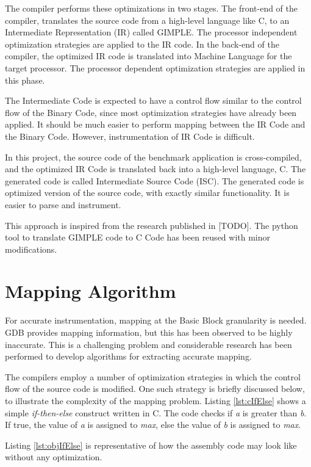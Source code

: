 The compiler performs these optimizations in two stages. The front-end of the compiler, translates the source code from a high-level language like C, to an Intermediate Representation (IR) called GIMPLE. The processor independent optimization strategies are applied to the IR code. In the back-end of the compiler, the optimized IR code is translated into Machine Language for the target processor. The processor dependent optimization strategies are applied in this phase.

The Intermediate Code is expected to have a control flow similar to the control flow of the Binary Code, since most optimization strategies have already been applied. It should be much easier to perform mapping between the IR Code and the Binary Code. However, instrumentation of IR Code is difficult. 

In this project, the source code of the benchmark application is cross-compiled, and the optimized IR Code is translated back into a high-level language, C. The generated code is called Intermediate Source Code (ISC). The generated code is optimized version of the source code, with exactly similar functionality. It is easier to parse and instrument.

This approach is inspired from the research published in [TODO]. The python tool to translate GIMPLE code to C Code has been reused with minor modifications.

\section{Mapping Algorithm}
For accurate instrumentation, mapping at the Basic Block granularity is needed. GDB provides mapping information, but this has been observed to be highly inaccurate. This is a challenging problem and considerable research has been performed to develop algorithms for extracting accurate mapping.

The compilers employ a number of optimization strategies in which the control flow of the source code is modified. One such strategy is briefly discussed below, to illustrate the complexity of the mapping problem. Listing \ref{lst:cIfElse} shows a simple \emph{if-then-else} construct written in C. The code checks if \emph{a} is greater than \emph{b}. If true, the value of \emph{a} is assigned to \emph{max}, else the value of \emph{b} is assigned to \emph{max}.

Listing \ref{lst:objIfElse} is representative of how the assembly code may look like without any optimization.

